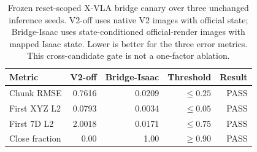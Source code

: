 \begin{table}[t]
\centering
\caption{Frozen reset-scoped X-VLA bridge canary over three unchanged inference seeds. V2-off uses native V2 images with official state; Bridge-Isaac uses state-conditioned official-render images with mapped Isaac state. Lower is better for the three error metrics. This cross-candidate gate is not a one-factor ablation.}
\label{tab:xvla_bridge_canary}
\begin{tabular}{lrrrr}
\toprule
Metric & V2-off & Bridge-Isaac & Threshold & Result \\
\midrule
Chunk RMSE & 0.7616 & 0.0209 & $\leq 0.25$ & PASS \\
First XYZ L2 & 0.0793 & 0.0034 & $\leq 0.05$ & PASS \\
First 7D L2 & 2.0018 & 0.0171 & $\leq 0.75$ & PASS \\
Close fraction & 0.00 & 1.00 & $\geq 0.90$ & PASS \\
\bottomrule
\end{tabular}
\end{table}
